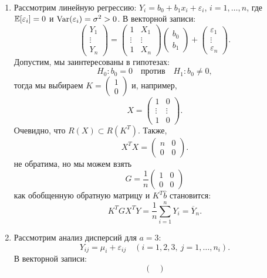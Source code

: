 \begin{exmp} \
	\begin{enumerate}
		\item Рассмотрим линейную регрессию: $Y_i = b_0 + b_1x_i + \varepsilon_i$, $i = 1, \dots, n$, где $\mathbb{E}[\varepsilon_i] = 0$ и $\mathrm{Var}(\varepsilon_i) = \sigma^2 > 0$. В векторной записи:
		\[
		\begin{pmatrix}
		Y_1 \\
		\vdots \\
		Y_n
		\end{pmatrix}
		=
		\begin{pmatrix}
		1 & X_1 \\
		\vdots & \vdots \\
		1 & X_n
		\end{pmatrix}
		\begin{pmatrix}
		b_0 \\
		b_1
		\end{pmatrix}
		+
		\begin{pmatrix}
		\varepsilon_1 \\
		\vdots \\
		\varepsilon_n
		\end{pmatrix}.
		\]
		Допустим, мы заинтересованы в гипотезах:
		\[ H_0: b_0 = 0 \quad \text{против} \quad H_1:b_0 \neq 0, \]
		тогда мы выбираем $K = \begin{pmatrix} 1 \\	0 \end{pmatrix}$ и, например,
		\[ X =	\begin{pmatrix}
		1 & 0 \\
		\vdots & \vdots \\
		1 & 0
		\end{pmatrix} . \]
		Очевидно, что $R(X) \subset R(K^T)$. Также,
		\[ X^TX =	\begin{pmatrix}
		n & 0 \\
		0 & 0
		\end{pmatrix} . \]
		не обратима, но мы можем взять
		\[ G = \frac{1}{n}	\begin{pmatrix}
		1 & 0 \\
		0 & 0
		\end{pmatrix} \]
		как обобщенную обратную матрицу и $K^T\hat{b}$ становится:
		\[ K^TGX^TY = \frac{1}{n} \sum_{i=1}^n Y_i = \overline{Y}_n. \] 
		\item Рассмотрим анализ дисперсий для $a = 3$:
		\[ Y_{ij} = \mu_i + \varepsilon_{ij} \quad (i = 1,2,3,\ j =1, \dots, n_i ). \]
		В векторной записи:
		\[
		\begin{pmatrix}

\end{pmatrix}\]
\end{enumerate}
\end{exmp}
